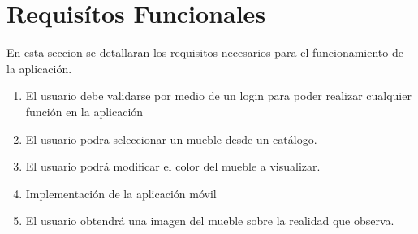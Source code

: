 \section{Requisítos Funcionales}
En esta seccion se detallaran los requisitos necesarios para el funcionamiento de la aplicación.\par
\vspace{5mm}
\begin{enumerate}[1.]
\item El usuario debe validarse por medio de un login para poder realizar cualquier función en la aplicación 
\item El usuario podra seleccionar un mueble desde un catálogo. 
\item El usuario podrá modificar el color del mueble a visualizar. 
\item Implementación de la aplicación móvil 
\item El usuario obtendrá una imagen del mueble sobre la realidad que observa.
\end{enumerate}